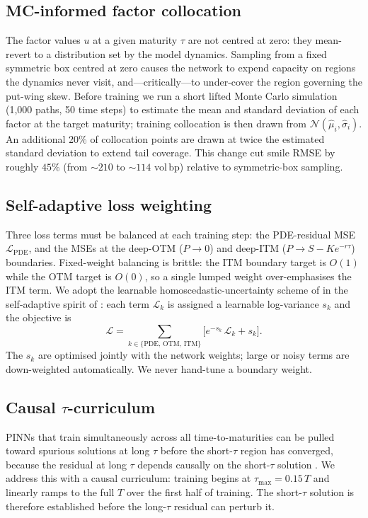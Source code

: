 \documentclass[review,12pt]{elsarticle}
\newcommand{\bp}{\ensuremath{\,\mathrm{bp}}}
\begin{document}
\subsection{MC-informed factor collocation}
\label{sec:mcsamp}
The factor values $u$ at a given maturity $\tau$ are not centred at zero: they
mean-revert to a distribution set by the model dynamics.  Sampling from a fixed
symmetric box centred at zero causes the network to expend capacity on regions the
dynamics never visit, and---critically---to under-cover the region governing the
put-wing skew.  Before training we run a short lifted Monte Carlo simulation
(1,000 paths, 50 time steps) to estimate the mean and standard deviation of each
factor at the target maturity; training collocation is then drawn from
$\mathcal{N}(\hat{\mu}_i, \hat{\sigma}_i)$.  An additional 20\% of collocation
points are drawn at twice the estimated standard deviation to extend tail coverage.
This change cut smile RMSE by roughly $45\%$ (from ${\sim}210$ to ${\sim}114$ vol\bp)
relative to symmetric-box sampling.

\subsection{Self-adaptive loss weighting}
\label{sec:adaptive}
Three loss terms must be balanced at each training step: the PDE-residual MSE
$\mathcal{L}_{\mathrm{PDE}}$, and the MSEs at the deep-OTM ($P\to0$) and deep-ITM
($P\to S - Ke^{-r\tau}$) boundaries.  Fixed-weight balancing is brittle: the
ITM boundary target is $O(1)$ while the OTM target is $O(0)$, so a single lumped
weight over-emphasises the ITM term.  We adopt the learnable
homoscedastic-uncertainty scheme of \citet{kendall2018multitask} in the
self-adaptive spirit of \citet{mcclenny2023self}: each term $\mathcal{L}_k$ is
assigned a learnable log-variance $s_k$ and the objective is
\begin{equation}
  \mathcal{L} = \sum_{k\in\{\mathrm{PDE},\,\mathrm{OTM},\,\mathrm{ITM}\}}
               \bigl[e^{-s_k}\,\mathcal{L}_k + s_k\bigr].
  \label{eq:adaptive}
\end{equation}
The $s_k$ are optimised jointly with the network weights; large or noisy terms
are down-weighted automatically.  We never hand-tune a boundary weight.

\subsection{Causal \texorpdfstring{$\tau$}{tau}-curriculum}
\label{sec:curriculum}
PINNs that train simultaneously across all time-to-maturities can be pulled toward
spurious solutions at long $\tau$ before the short-$\tau$ region has converged,
because the residual at long $\tau$ depends causally on the short-$\tau$ solution
\citep{wang2024respecting}.  We address this with a causal curriculum: training
begins at $\tau_{\mathrm{max}} = 0.15\,T$ and linearly ramps to the full $T$ over
the first half of training.  The short-$\tau$ solution is therefore established
before the long-$\tau$ residual can perturb it.
\end{document}
